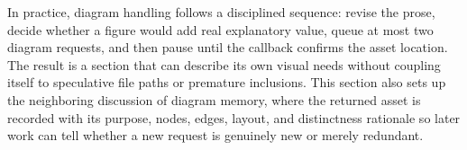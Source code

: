 In practice, diagram handling follows a disciplined sequence: revise the prose, decide whether a figure would add real explanatory value, queue at most two diagram requests, and then pause until the callback confirms the asset location. The result is a section that can describe its own visual needs without coupling itself to speculative file paths or premature inclusions. This section also sets up the neighboring discussion of diagram memory, where the returned asset is recorded with its purpose, nodes, edges, layout, and distinctness rationale so later work can tell whether a new request is genuinely new or merely redundant.
